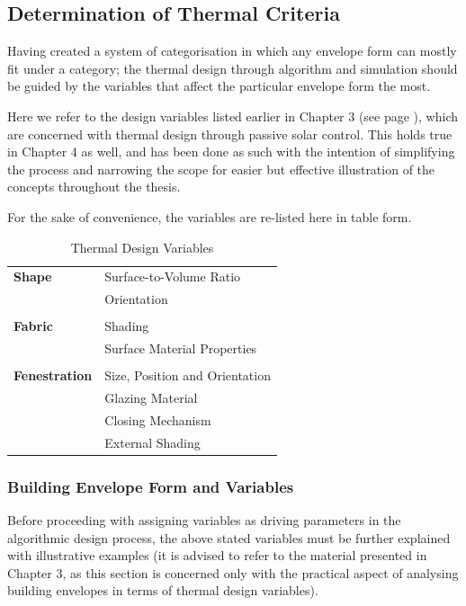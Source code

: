 \clearpage
\subsection{Determination of Thermal Criteria}

Having created a system of categorisation in which any envelope form can mostly fit under a category; the thermal design through algorithm and simulation should be guided by the variables that affect the particular envelope form the most.

Here we refer to the design variables listed earlier in Chapter 3 (see page \pageref{sec:ThermalDesignVariables}), which are concerned with thermal design through passive solar control. This holds true in Chapter 4 as well, and has been done as such with the intention of simplifying the process and narrowing the scope for easier but effective illustration of the concepts throughout the thesis.

For the sake of convenience, the variables are re-listed here in table form.

\begin{table}[H]
	\centering
	\begin{tabular}{l|l}
		\textbf{Shape}		&Surface-to-Volume Ratio\\
					&Orientation\\
					&\\
		\textbf{Fabric} 	&Shading\\
					&Surface Material Properties\\
					&\\
		\textbf{Fenestration}	&Size, Position and Orientation\\
					&Glazing Material\\
					&Closing Mechanism\\
					&External Shading\\
	\end{tabular}
	\caption{Thermal Design Variables}
	\label{tab:ThermalDesignVariables}
\end{table}

\subsubsection{Building Envelope Form and Variables}

Before proceeding with assigning variables as driving parameters in the algorithmic design process, the above stated variables must be further explained with illustrative examples (it is advised to refer to the material presented in Chapter 3, as this section is concerned only with the practical aspect of analysing building envelopes in terms of thermal design variables).

